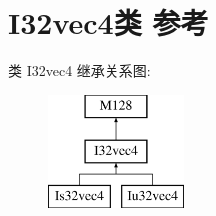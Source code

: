 \hypertarget{class_i32vec4}{}\section{I32vec4类 参考}
\label{class_i32vec4}
类 I32vec4 继承关系图\+:\begin{figure}[H]
\begin{center}
\leavevmode
\includegraphics[height=3.000000cm]{class_i32vec4}
\end{center}
\end{figure}
